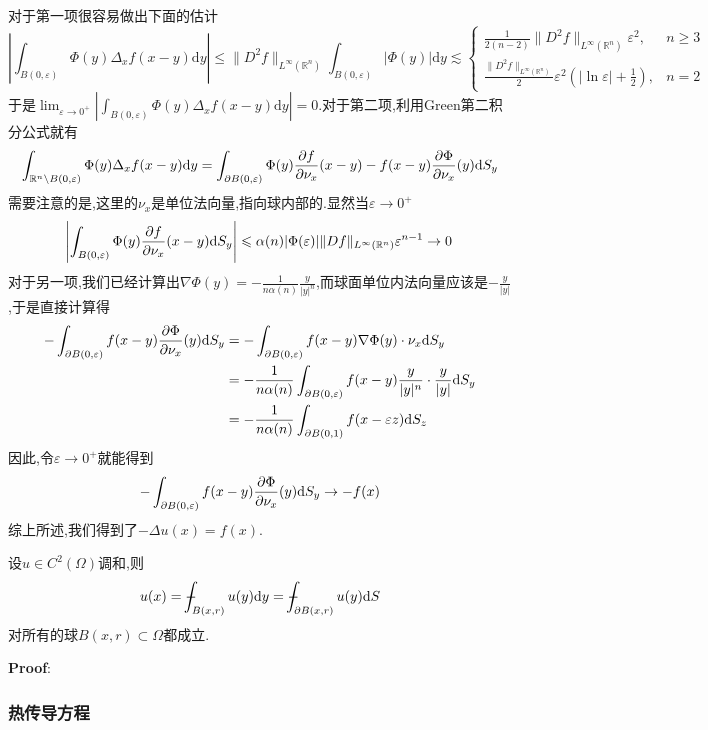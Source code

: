 对于第一项很容易做出下面的估计
$$
\left|\int_{B(0,\varepsilon)}\Phi(y)\Delta_{x}f(x-y)\mathrm{d}y\right|\leqslant \|D^2f\|_{L^{\infty}(\mathbb{R}^n)}\int_{B(0,\varepsilon)}|\Phi(y)|\mathrm{d}y\lesssim 
\begin{cases}
    \frac{1}{2(n-2)} \|D^2f\|_{L^{\infty}(\mathbb{R}^n)}\varepsilon^2,&n\geqslant 3\\[8pt]
    \frac{\|D^2f\|_{L^{\infty}(\mathbb{R}^n)}}{2}\varepsilon^2(|\ln \varepsilon|+\frac{1}{2}),& n=2
\end{cases}
$$
于是$\lim_{\varepsilon\to 0^+}\left|\int_{B(0,\varepsilon)}\Phi(y)\Delta_{x}f(x-y)\mathrm{d}y\right|=0$.对于第二项,利用Green第二积分公式就有
$$
\int_{\mathbb{R}^n\setminus B(0,\varepsilon)}\Phi(y)\Delta_{x}f(x-y)\mathrm{d}y=\int_{\partial B(0,\varepsilon)}\Phi(y)\frac{\partial f}{\partial \nu_{x}}(x-y)-f(x-y)\frac{\partial\Phi}{\partial\nu_{x}}(y)\mathrm{d}S_y
$$
需要注意的是,这里的$\nu_{x}$是单位法向量,指向球内部的.显然当$\varepsilon\to 0^+$
$$
\left|\int_{B(0,\varepsilon)}\Phi(y)\frac{\partial f}{\partial \nu_{x}}(x-y)\mathrm{d}S_y\right|\leqslant \alpha(n)|\Phi(\varepsilon)|\|Df\|_{L^{\infty}(\mathbb{R}^n)}\varepsilon^{n-1}\to 0\,
$$
对于另一项,我们已经计算出$\nabla\Phi(y)=-\frac{1}{n\alpha(n)}\frac{y}{|y|^n}$,而球面单位内法向量应该是$-\frac{y}{|y|}$,于是直接计算得
$$
\begin{aligned}
    -\int_{\partial B(0,\varepsilon)}f(x-y)\frac{\partial\Phi}{\partial\nu_{x}}(y)\mathrm{d}S_y &= -\int_{\partial B(0,\varepsilon)}f(x-y)\nabla \Phi(y)\cdot \nu_{x}\mathrm{d}S_y\\
                                                                                 &= -\frac{1}{n\alpha(n)}\int_{\partial B(0,\varepsilon)}f(x-y)\frac{y}{|y|^n}\cdot\frac{y}{|y|}\mathrm{d}S_y\\
                                                                                 &= -\frac{1}{n\alpha(n)}\int_{\partial B(0,1)}f(x-\varepsilon z)\mathrm{d}S_z
\end{aligned}
$$
因此,令$\varepsilon\to 0^+$就能得到
$$
-\int_{\partial B(0,\varepsilon)}f(x-y)\frac{\partial\Phi}{\partial\nu_{x}}(y)\mathrm{d}S_y\to -f(x)
$$
综上所述,我们得到了$-\Delta u(x)=f(x)$.
\begin{tcolorbox}[colback=KuangNei,colframe=BianKuang,title=\textbf{平均值公式},sharpish corners]
    设$u\in C^2(\Omega)$调和,则
    $$
    u(x)=\fint_{B(x,r)}u(y)\mathrm{d}y=\fint_{\pa B(x,r)}u(y)\mathrm{d}S
    $$
    对所有的球$B(x,r)\subset \Omega$都成立.
\end{tcolorbox}
\textbf{Proof}:


\subsubsection{热传导方程}


